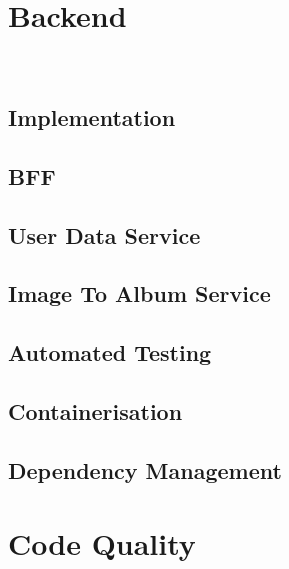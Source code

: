\section{Backend}~\label{sec:backend-development}
\subsection{Implementation}
\subsection{BFF}
\subsection{User Data Service}
\subsection{Image To Album Service}
\subsection{Automated Testing}
\subsection{Containerisation}
\subsection{Dependency Management}

\section{Code Quality}~\label{sec:code-quality}

